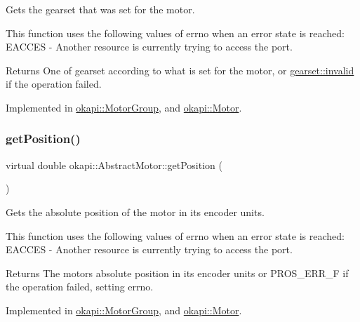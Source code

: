 Gets the gearset that was set for the motor.

This function uses the following values of errno when an error state is reached\+: E\+A\+C\+C\+ES -\/ Another resource is currently trying to access the port.

\begin{DoxyReturn}{Returns}
One of gearset according to what is set for the motor, or \mbox{\hyperlink{classokapi_1_1AbstractMotor_a88aaa6ea2fa10f5520a537bbf26774d5afedb2d84cafe20862cb4399751a8a7e3}{gearset\+::invalid}} if the operation failed. 
\end{DoxyReturn}


Implemented in \mbox{\hyperlink{classokapi_1_1MotorGroup_abe6d309d6e883b469997c4ddc4584834}{okapi\+::\+Motor\+Group}}, and \mbox{\hyperlink{classokapi_1_1Motor_a4dbe4aec1a4c6cb1cad659bada1ab8ed}{okapi\+::\+Motor}}.

\mbox{\label{classokapi_1_1AbstractMotor_a4f9d74e054600c5ddb49ebb8164004d3}} 
\subsubsection{\texorpdfstring{getPosition()}{getPosition()}}
{\footnotesize\ttfamily virtual double okapi\+::\+Abstract\+Motor\+::get\+Position (\begin{DoxyParamCaption}{ }\end{DoxyParamCaption})\hspace{0.3cm}{\ttfamily [pure virtual]}}

Gets the absolute position of the motor in its encoder units.

This function uses the following values of errno when an error state is reached\+: E\+A\+C\+C\+ES -\/ Another resource is currently trying to access the port.

\begin{DoxyReturn}{Returns}
The motor\textquotesingle{}s absolute position in its encoder units or P\+R\+O\+S\+\_\+\+E\+R\+R\+\_\+F if the operation failed, setting errno. 
\end{DoxyReturn}


Implemented in \mbox{\hyperlink{classokapi_1_1MotorGroup_a6bf3c5a2f5caf0e5b02e8dcf2e8130d9}{okapi\+::\+Motor\+Group}}, and \mbox{\hyperlink{classokapi_1_1Motor_a4592f8a1cce4474f85ceabd3d7e2fe0b}{okapi\+::\+Motor}}.


